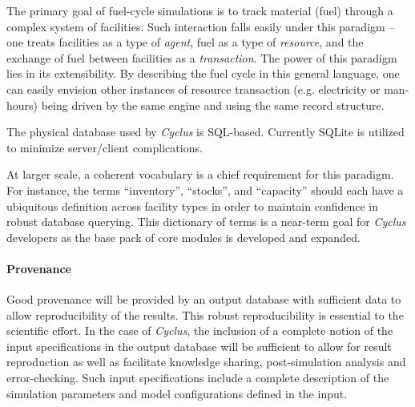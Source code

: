 \documentclass[letterpaper,10pt,english]{sphinxmanual}
\begin{document}
The primary goal of fuel-cycle simulations is to track material (fuel) through
a complex system of facilities. Such interaction falls easily under this paradigm
-- one treats facilities as a type of \emph{agent}, fuel as a type of \emph{resource}, and the
exchange of fuel between facilities as a \emph{transaction}. The power of this paradigm
lies in its extensibility. By describing the fuel cycle in this general language,
one can easily envision other instances of resource transaction (e.g. electricity
or man-hours) being driven by the same engine and using the same record
structure.

The physical database used by \emph{Cyclus} is SQL-based. Currently SQLite is utilized
to minimize server/client complications.

At larger scale, a coherent vocabulary is a chief requirement for this paradigm.
For instance, the terms ``inventory'', ``stocks'', and ``capacity'' should each have a
ubiquitous definition across facility types in order to maintain confidence in
robust database querying. This dictionary of terms is a near-term goal for \emph{Cyclus}
developers as the base pack of core modules is developed and expanded.


\paragraph{Provenance}
\label{devdoc/output_dbase:provenance}
Good provenance will be provided by an output database with sufficient data to
allow reproducibility of the results. This robust reproducibility is essential
to the scientific effort. In the case of \emph{Cyclus}, the inclusion of a complete
notion of the input specifications in the output database will be sufficient to
allow for result reproduction as well as facilitate knowledge sharing,
post-simulation analysis and error-checking. Such input specifications include
a complete description of the simulation parameters and model configurations
defined in the input.
\end{document}
